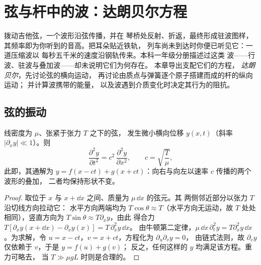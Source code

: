 \chapter{弦与杆中的波：达朗贝尔方程}\label{ch:b2:waves-on-strings}

拨动吉他弦，一个波形沿弦传播，并在
琴桥处反射、折返，最终形成驻波图样，
其频率即为你听到的音高。把耳朵贴近铁轨，
列车尚未到达时你便已听见它：一道压缩波以
每秒五千米的速度沿钢轨传来。本科一年级分册描述过这类
波——行波、驻波与叠加波——却未说明它们为何存在。
本章导出支配它们的方程，
\emph{达朗贝尔}，先讨论弦的横向运动，
再讨论由质点与弹簧逐个原子搭建而成的杆的纵向运动；
并计算波携带的能量，
以及波遇到介质变化时决定其行为的阻抗。

\section{弦的振动}

\begin{theorem}[弦的波动方程]\label{thm:b2:waves-on-strings:equation}
线密度为 $\mu$、张紧于张力 $T$ 之下的弦，
发生微小横向位移 $y(x, t)$（斜率 $|\partial_xy| \ll 1$）。则
\[
\frac{\partial^2y}{\partial t^2} = c^2\,\frac{\partial^2y}{\partial x^2} ,
\qquad c = \sqrt{\frac{T}{\mu}} ,
\]
此即\emph{}，其通解为 $y = f(x - ct)
+ g(x + ct)$：向右与向左以速率 $c$ 传播的两个波形的叠加，
二者均保持形状不变。
\end{theorem}

\begin{proof}
取位于 $x$ 与 $x + \dd x$ 之间、质量为 $\mu\,\dd x$ 的弦元。其
两侧邻近部分以张力 $T$ 沿切线方向拉动它：
水平方向两端均为 $T\cos\theta \approx T$（水平方向无运动，故
$T$ 处处相同），竖直方向为 $T\sin\theta \approx T\partial_xy$，由此
得合力 $T[\partial_xy(x + \dd x) - \partial_xy(x)] = T\,\partial_x^2y\,\dd x$。
由牛顿第二定律，$\mu\,\dd x\,\partial_t^2y = T\partial_x^2y\,\dd x$。为求解，令
$u = x - ct$，$v = x + ct$，方程化为 $\partial_u\partial_vy = 0$，
由链式法则，故 $\partial_vy$ 仅依赖于 $v$，于是 $y = f(u) + g(v)$；
反之，任何这样的 $y$ 均满足该方程。重力可略去，
当 $T \gg \mu gL$ 时则是合理的。
\end{proof}

